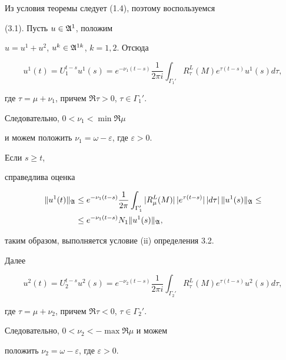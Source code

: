  


\begin{pf} Из условия теоремы следует (1.4), поэтому воспользуемся 


(3.1). Пусть $u\in\frak A^1$, положим 


$u=u^1+u^2$, $u^k\in\frak A^{1k}$, $k=1,2$. Отсюда 


\begin{equation} 


u^1(t)=U_1^{t-s}u^1(s)=e^{-\nu_1(t-s)}\frac{1}{2\pi i} 


\int_{\Gamma_1'}R^L_\tau(M)e^{\tau(t-s)}u^1(s)d\tau, 


\end{equation} 


где $\tau=\mu+\nu_1$, причем $\Re \tau>0$, $\tau\in\Gamma_1'$. 


Следовательно, $0<\nu_1<\min\Re \mu$ 


и можем положить $\nu_1=\omega-\varepsilon$, где $\varepsilon>0$. 


Если $s\ge t$, 


справедлива оценка 


\begin{align*} 


\|u^1(t)\|_{\frak A} &\le e^{-\nu_1(t-s)}\frac{1}{2\pi} 


\int_{\Gamma_1'}|R^L_\mu(M)|\,|e^{\tau(t-s)}|\,|d\tau|\, 


\|u^1(s)\|_{\frak A}\le \\ 


& \le e^{-\nu_1(t-s)}N_1\|u^1(s)\|_{\frak A}, 


\end{align*} 


таким образом, выполняется условие (ii) определения 3.2. 


 


Далее 


\begin{equation} 


u^2(t)=U_2^{t-s}u^2(s)=e^{-\nu_2(t-s)}\frac{1}{2\pi i} 


\int_{\Gamma_2'}R^L_\tau(M)e^{\tau(t-s)}u^2(s)d\tau, 


\end{equation} 


где $\tau=\mu+\nu_2$, причем $\Re \tau<0$, $\tau\in\Gamma_2'$. 


Следовательно, $0<\nu_2<-\max\Re\mu$ и можем 


положить $\nu_2=\omega-\varepsilon$, где $\varepsilon>0$. 



\end{pf}
